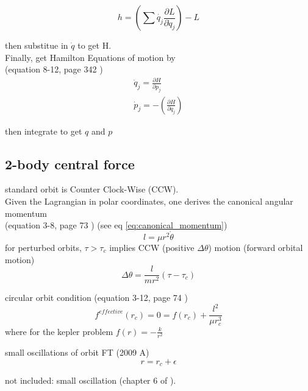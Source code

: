 \documentclass[12pt]{article}  %
\def\qualifyingyear{F}
\begin{document}
\begin{equation}
h = \left( \sum \dot{q_j} \frac{\partial L}{\partial \dot{q} _{j} } \right) - L
\end{equation}

then substitue in $\dot{q}$ to get H. \\ 
Finally, get Hamilton Equations of motion by \\ 
(equation 8-12, page 342 \cite{GoldsteinCM})
\begin{equation}
\begin{gathered}
\dot{q} _{j} =\frac{\partial H}{\partial p_{j} } \\ 
\dot{p} _{j} = - \left( \frac{\partial H}{\partial q_{j} } \right) 
\end{gathered}
\end{equation}

then integrate to get $q$ and $p$

\subsection{2-body central force}
standard orbit is Counter Clock-Wise (CCW). \\ 
Given the Lagrangian in polar coordinates, one derives the canonical angular momentum \\ 
(equation 3-8, page 73 \cite{GoldsteinCM}) (see eq \ref{eq:canonical_momentum})
\begin{equation}
l = \mu r^2 \dot{\theta}
\end{equation}
for perturbed orbits, $ \tau > \tau_c$ implies CCW (positive $\Delta\theta$) motion (forward orbital motion)
\begin{equation}
\Delta \theta = \frac{l}{m r^2}(\tau - \tau_c)
\end{equation}

circular orbit condition (equation 3-12, page 74  \cite{GoldsteinCM})
\begin{equation}
f^{effective}(r_c) = 0 = f(r_c) + \frac{l^2}{\mu r_c^3}
\end{equation}
where for the kepler problem $f(r) = -\frac{k}{r^2}$

small oscillations of orbit
\if\qualifyingyear T
(2009 A)
\fi
\begin{equation}
r = r_c + \epsilon
\end{equation}

not included: small oscillation (chapter 6 of  \cite{GoldsteinCM}).


\end{document}
